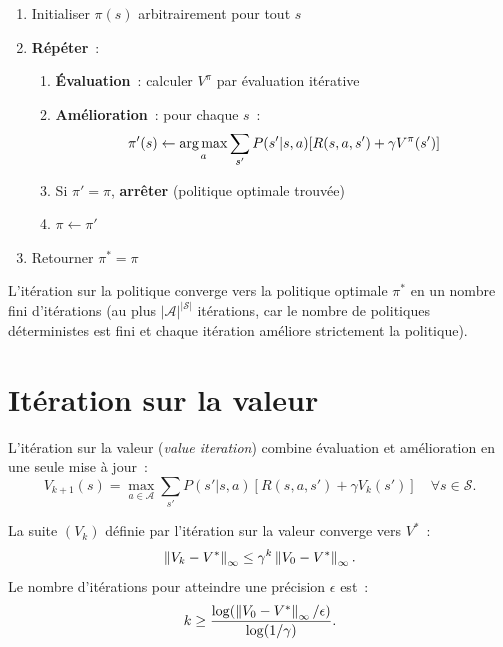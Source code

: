 \begin{algorithme}[title=\textbf{It\'eration sur la politique (\emph{Policy Iteration})}]
\begin{enumerate}
    \item Initialiser $\pi(s)$ arbitrairement pour tout $s$
    \item \textbf{R\'ep\'eter}~:
    \begin{enumerate}
        \item \textbf{\'Evaluation}~: calculer $V^\pi$ par \'evaluation it\'erative
        \item \textbf{Am\'elioration}~: pour chaque $s$~:
        \[
            \pi'(s) \leftarrow \operatorname*{arg\,max}_a \sum_{s'} P(s'|s,a)[R(s,a,s') + \gamma V^\pi(s')]
        \]
        \item Si $\pi' = \pi$, \textbf{arr\^eter} (politique optimale trouv\'ee)
        \item $\pi \leftarrow \pi'$
    \end{enumerate}
    \item Retourner $\pi^* = \pi$
\end{enumerate}
\end{algorithme}

\begin{theoreme}
L'it\'eration sur la politique converge vers la politique optimale $\pi^*$ en un
nombre fini d'it\'erations (au plus $|\mathcal{A}|^{|\mathcal{S}|}$ it\'erations,
car le nombre de politiques d\'eterministes est fini et chaque it\'eration
am\'eliore strictement la politique).
\end{theoreme}

\section{It\'eration sur la valeur}

\begin{definition}
L'it\'eration sur la valeur (\emph{value iteration}) combine \'evaluation et
am\'elioration en une seule mise \`a jour~:
\[
    V_{k+1}(s) = \max_{a \in \mathcal{A}} \sum_{s'} P(s'|s,a)
    [R(s,a,s') + \gamma V_k(s')] \quad \forall s \in \mathcal{S}.
\]
\end{definition}

\begin{theoreme}
La suite $(V_k)$ d\'efinie par l'it\'eration sur la valeur converge vers $V^*$~:
\[
    \left\| V_k - V^* \right\|_\infty \leq \gamma^k \left\| V_0 - V^* \right\|_\infty.
\]
Le nombre d'it\'erations pour atteindre une pr\'ecision $\epsilon$ est~:
\[
    k \geq \frac{\log(\left\| V_0 - V^* \right\|_\infty / \epsilon)}{\log(1/\gamma)}.
\]
\end{theoreme}


